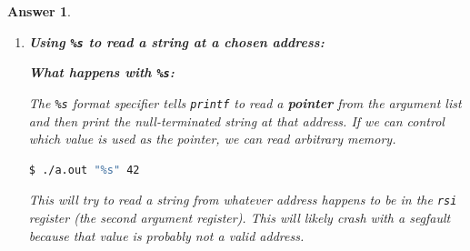 \documentclass[a4paper,11pt]{article}
\theoremstyle{plain}
\newtheorem{correction}{Answer}
\theoremstyle{definition}
\begin{document}
\begin{correction}
\begin{enumerate}
\medskip
\textbf{Using \texttt{\%lx} to read 64-bit values:}
\begin{lstlisting}[language=bash,numbers=none]
$ ./a.out "%lx.%lx.%lx.%lx.%lx.%lx.%lx.%lx.%lx.%lx" 42
\end{lstlisting}

Each \texttt{\%lx} reads an 8-byte value (long) from the argument list. This reveals the contents of the stack: local variables, saved registers, return addresses, etc.

\medskip
\textbf{Using positional arguments to target specific stack slots:}

The notation \texttt{\%N\$lx} reads the $N$-th argument directly:
\begin{lstlisting}[language=bash,numbers=none]
$ ./a.out "%1\$lx %2\$lx %3\$lx %4\$lx %5\$lx %6\$lx %7\$lx %8\$lx" 42
\end{lstlisting}

This allows reading specific positions in the argument list without consuming all the preceding values. By varying $N$, you can explore the entire stack.

\medskip
\textbf{Why does \texttt{printf} process these format specifiers?}

When \texttt{printf} encounters a format specifier (\texttt{\%x}, \texttt{\%lx}, \texttt{\%s}, etc.), it reads the next argument from the calling convention's argument locations (registers first, then stack). It has \textbf{no way to know} how many arguments were actually provided -- it blindly trusts the format string. With \texttt{printf(texte)}, the attacker controls the format string and can therefore read (and even write) arbitrary memory.

\item \textbf{Using \texttt{\%s} to read a string at a chosen address:}

\medskip
\textbf{What happens with \texttt{\%s}:}

The \texttt{\%s} format specifier tells \texttt{printf} to read a \textbf{pointer} from the argument list and then print the null-terminated string at that address. If we can control which value is used as the pointer, we can read arbitrary memory.

\begin{lstlisting}[language=bash,numbers=none]
$ ./a.out "%s" 42
\end{lstlisting}

This will try to read a string from whatever address happens to be in the \texttt{rsi} register (the second argument register). This will likely crash with a segfault because that value is probably not a valid address.


\end{enumerate}
\end{correction}
\end{document}
